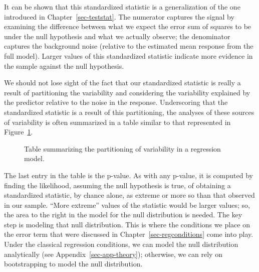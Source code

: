\documentclass[
  letterpaper,
  DIV=11,
  numbers=noendperiod]{scrreprt}
\theoremstyle{definition}
\theoremstyle{definition}
\theoremstyle{plain}
\theoremstyle{remark}
\begin{document}
It can be shown that this standardized statistic is a generalization of
the one introduced in Chapter~\ref{sec-teststat}. The numerator captures
the signal by examining the difference between what we expect the error
sum of squares to be under the null hypothesis and what we actually
observe; the denominator captures the background noise (relative to the
estimated mean response from the full model). Larger values of this
standardized statistic indicate more evidence in the sample against the
null hypothesis.

We should not lose sight of the fact that our standardized statistic is
really a result of partitioning the variability and considering the
variability explained by the predictor relative to the noise in the
response. Underscoring that the standardized statistic is a result of
this partitioning, the analyses of these sources of variability is often
summarized in a table similar to that represented in
Figure~\ref{fig-regquality-ANOVA-table}.

\begin{figure}


\caption{\label{fig-regquality-ANOVA-table}Table summarizing the
partitioning of variability in a regression model.}

\end{figure}%

The last entry in the table is the p-value. As with any p-value, it is
computed by finding the likelihood, assuming the null hypothesis is
true, of obtaining a standardized statistic, by chance alone, as extreme
or more so than that observed in our sample. ``More extreme'' values of
the statistic would be larger values; so, the area to the right in the
model for the null distribution is needed. The key step is modeling that
null distribution. This is where the conditions we place on the error
term that were discussed in Chapter~\ref{sec-regconditions} come into
play. Under the classical regression conditions, we can model the null
distribution analytically (see Appendix~\ref{sec-app-theory});
otherwise, we can rely on bootstrapping to model the null distribution.
\end{document}
